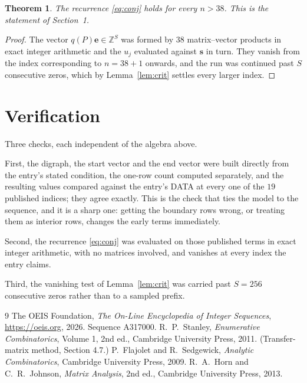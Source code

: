 \documentclass[11pt,a4paper]{article}
\theoremstyle{plain}
\newtheorem{theorem}{Theorem}
\theoremstyle{definition}
\begin{document}
\begin{theorem}
The recurrence \eqref{eq:conj} holds for every $n>38$. This is the statement of
Section~1.
\end{theorem}

\begin{proof}
The vector $q(P)\mathbf{e}\in\mathbb{Z}^{S}$ was formed by $38$ matrix--vector
products in exact integer arithmetic and the $u_j$ evaluated against $\mathbf{s}$ in turn.
They vanish from the index corresponding to $n=38+1$ onwards, and the run was continued
past $S$ consecutive zeros, which by Lemma~\ref{lem:crit} settles every larger index.
\end{proof}

\section{Verification}

Three checks, each independent of the algebra above.

First, the digraph, the start vector and the end vector were built directly from the
entry's stated condition, the one-row count computed separately, and the resulting values
compared against the entry's DATA at every one of the $19$ published indices; they
agree exactly. This is the check that ties the model to the sequence, and it is a sharp one:
getting the boundary rows wrong, or treating them as interior rows, changes the early terms
immediately.

Second, the recurrence \eqref{eq:conj} was evaluated on those published terms in exact
integer arithmetic, with no matrices involved, and vanishes at every index the entry claims.

Third, the vanishing test of Lemma~\ref{lem:crit} was carried past $S=256$ consecutive
zeros rather than to a sampled prefix.

\begin{thebibliography}{9}
 The OEIS Foundation, \emph{The On-Line Encyclopedia of Integer
Sequences}, \url{https://oeis.org}, 2026. Sequence A317000.
 R.~P.~Stanley, \emph{Enumerative Combinatorics}, Volume 1, 2nd ed.,
Cambridge University Press, 2011. (Transfer-matrix method, Section 4.7.)
 P.~Flajolet and R.~Sedgewick, \emph{Analytic Combinatorics}, Cambridge
University Press, 2009.
 R.~A.~Horn and C.~R.~Johnson, \emph{Matrix Analysis}, 2nd ed., Cambridge
University Press, 2013.
\end{thebibliography}
\end{document}
